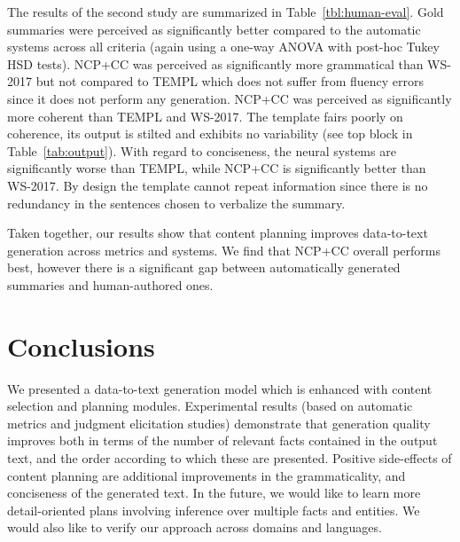 \documentclass[letterpaper]{article} \usepackage{aaai19}  \usepackage{times}  \usepackage{helvet}  \usepackage{courier}  \usepackage{url}  \usepackage{graphicx}  \frenchspacing  \setlength{\pdfpagewidth}{8.5in}  \setlength{\pdfpageheight}{11in}  \graphicspath{ {images/} }
\begin{document}
The results of the second study are summarized in
Table~\ref{tbl:human-eval}.  Gold summaries were perceived as
significantly better compared to the automatic systems across all
criteria (again using a one-way ANOVA with post-hoc Tukey HSD
tests). NCP+CC was perceived as significantly more grammatical than
WS-2017 but not compared to TEMPL which does not suffer from
fluency errors since it does not perform any generation. NCP+CC was
perceived as significantly more coherent than TEMPL and WS-2017. The
template fairs poorly on coherence, its output is stilted and exhibits
no variability (see top block in Table~\ref{tab:output}). With regard
to conciseness, the neural systems are significantly worse than TEMPL,
while NCP+CC is significantly better than WS-2017. By design the
template cannot repeat information since there is no redundancy in the
sentences chosen to verbalize the summary.

Taken together, our results show that content planning improves
data-to-text generation across metrics and systems. We find that
NCP+CC overall performs best, however there is a significant gap
between automatically generated summaries and human-authored ones.






\section{Conclusions}
\label{sec:conclusions}

We presented a data-to-text generation model which is enhanced with
content selection and planning modules. Experimental results (based on
automatic metrics and judgment elicitation studies) demonstrate that
generation quality improves both in terms of the number of relevant
facts contained in the output text, and the order according to which
these are presented. Positive side-effects of content planning are
additional improvements in the grammaticality, and conciseness of the
generated text.  In the future, we would like to learn more
detail-oriented plans involving inference over multiple facts and
entities. We would also like to verify our approach across domains and
languages.





\fontsize{9.0pt}{10.0pt} \selectfont


\end{document}
